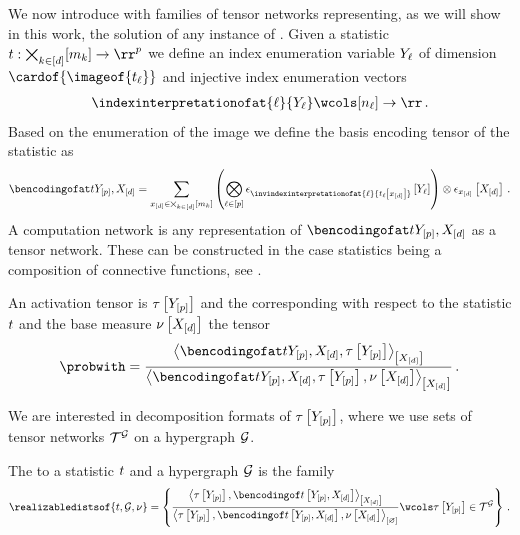 We now introduce with \ComputationActivationNetworks{} families of tensor networks representing, as we will show in this work, the solution of any instance of .
Given a statistic $\sstat:\facstates\rightarrow\rr^{\seldim}$ we define an index enumeration variable $Y_{\ell}$ of dimension $\cardof{\imageof{\sstatcoordinateof{\selindex}}}$ and injective index enumeration vectors
\begin{align*}
    \indexinterpretationofat{\selindex}{\headvariableof{\selindex}} \wcols [\headdimof{\selindex}] \rightarrow \rr \, .
\end{align*}
Based on the enumeration of the image we define the basis encoding tensor of the statistic as
\begin{align*}
    \sstatccwith
    = \sum_{\shortcatindicesin}
    \left(\bigotimes_{\selindexin}
        \onehotmapofat{\invindexinterpretationofat{\selindex}{\sstatcoordinateofat{\selindex}{\shortcatindices}}}{\headvariableof{\selindex}}\right)
    \otimes \onehotmapofat{\shortcatindices}{\shortcatvariables} \, .
\end{align*}
A computation network is any representation of $\sstatccwith$ as a tensor network.
These can be constructed in the case statistics being a composition of connective functions, see \cite{goessmann_tensor_2026}.

An activation tensor is $\tau\left[Y_{[p]}\right]$ and the corresponding \ComputationActivationNetwork{} with respect to the statistic $t$ and the base measure $\nu\left[X_{[d]}\right]$ the tensor
\begin{align*}
    \probwith
    = \frac{
        \contractionof{\sstatccwith,\hypercoreat{\headvariables}}{\shortcatvariables}
    }{
        \contractionof{\sstatccwith,\hypercoreat{\headvariables},\basemeasurewith}{\shortcatvariables}
    } \, .
\end{align*}

We are interested in decomposition formats of $\tau\left[Y_{[p]}\right]$, where we use sets of tensor networks $\mathcal{T}^{\mathcal{G}}$ on a hypergraph $\mathcal{G}$.

\begin{definition}
    The \ComputationActivationNetworks{} to a statistic $t$ and a hypergraph $\mathcal{G}$ is the family
    \begin{align*}
        \realizabledistsof{\sstat,\graph,\basemeasure}
        = \left\{
              \frac{\contractionof{\hypercoreat{\headvariables},\bencsstatwith}{\shortcatvariables}}{\contraction{\hypercoreat{\headvariables},\bencsstatwith,\basemeasurewith}}
              \wcols \hypercoreat{\headvariables} \in \tnsetof{\graph} \right\} \, .
    \end{align*}
\end{definition}

